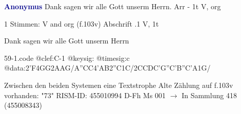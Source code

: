 \documentclass[twocolumn]{book}
\begin{document}
\newline \par \vspace{7pt} \textcolor{darkblue}{\textbf{Anonymus  }}
\newline Dank sagen wir alle Gott unserm Herrn. Arr - 1t
\newline V, org
\newline \begin{itshape}\end{itshape} 
\newline \textcolor{darkblue}{}  1 Stimmen: V and org  (f.103v)
\newline Abschrift
.1  V, 1t
\newline \begin{footnotesize} Dank sagen wir alle Gott unserm Herrn \end{footnotesize}  
\begin{filecontents*}{59-1.code}
@clef:C-1
@keysig:
@timesig:c
@data:2'F4GG2AAG/A''CC4'AB2''C1C/2CCDC'G''C'B''C'A1G/
\end{filecontents*}
\newline
%
\newline Zwischen den beiden Systemen eine Textstrophe
\newline Alte Zählung auf f.103v vorhanden: "73"
\newline RISM-ID: 455010994
\newline D-Fh  Ms 001
\newline $\rightarrow$ In Sammlung 418 (455008343)
      
\end{document}
